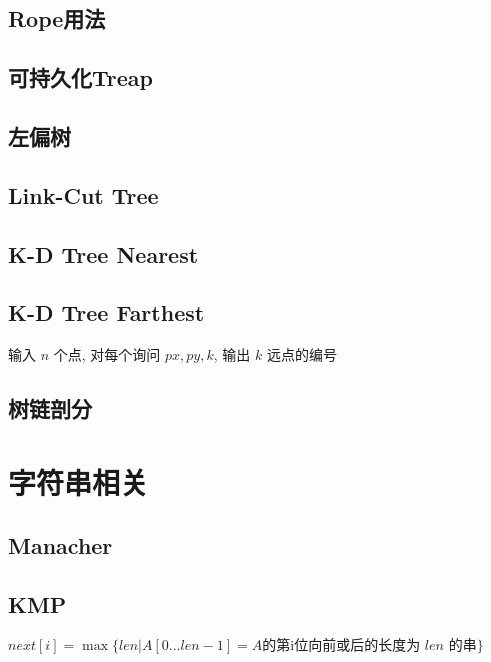\documentclass[landscape, twocolumn, 8pt, a4paper, twoside]{extarticle}
\begin{document}
  \subsection{Rope用法}
    
  
  \subsection{可持久化Treap}
    
  
  \subsection{左偏树}
    
  
  \subsection{Link-Cut Tree}
    

  \subsection{K-D Tree Nearest}
    

  \subsection{K-D Tree Farthest}
    输入 $n$ 个点, 对每个询问 $px, py, k$, 输出 $k$ 远点的编号
    

  \subsection{树链剖分}
    

\section{字符串相关}
  \subsection{Manacher}
    

  \subsection{KMP}
    $next[i] = \max\{len | A[0 \ldots len - 1] = A \textrm{的第i位向前或后的长度为 $len$ 的串} \}$
\end{document}
